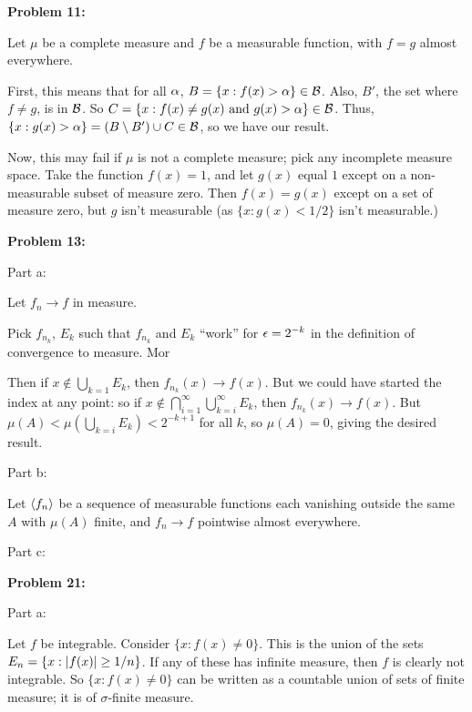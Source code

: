 \documentclass[a4paper,12pt]{article}
\begin{document}
\shunt

{\bf Problem 11:}

Let $\mu$ be a complete measure and $f$ be a measurable function, with $f=g$ almost everywhere.

First, this means that for all $\alpha$, $B= \{x: f(x) > \alpha\} \in \mathcal{B}$. Also, $B'$, the set where $f \neq g$, is in $\mathcal{B}$. So $C = \{x: f(x) \neq g(x) \text{ and } g(x) > \alpha \} \in \mathcal{B}$. Thus, $\{x: g(x) > \alpha\} = (B \setminus B') \cup C \in \mathcal{B}$, so we have our result. 

Now, this may fail if $\mu$ is not a complete measure; pick any incomplete measure space. Take the function $f(x)=1$, and let $g(x)$ equal $1$ except on a non-measurable subset of measure zero. Then $f(x)=g(x)$ except on a set of measure zero, but $g$ isn't measurable (as $\{x: g(x) < 1/2\}$ isn't measurable.)

\shunt

{\bf Problem 13:}

Part a:

Let $f_n \to f$ in measure.

Pick $f_{n_k}$, $E_{k}$ such that $f_{n_k}$ and $E_{k}$ ``work'' for $\epsilon = 2^{-k}$ in the definition of convergence to measure. Mor

Then if $x \notin \bigcup\limits_{k=1} E_k$, then $f_{n_k}(x) \to f(x)$. But we could have started the index at any point: so if $x \notin \bigcap\limits_{i=1}^\infty \bigcup\limits_{k=i}^\infty E_k$, then $f_{n_k}(x) \to f(x)$. But $\mu(A) < \mu(\bigcup_{k=i} E_k) < 2^{-k+1}$ for all $k$, so $\mu(A) = 0$, giving the desired result.

\shunt

Part b:

Let $\left\langle f_n \right\rangle$ be a sequence of measurable functions each vanishing outside the same $A$ with $\mu(A)$ finite, and $f_n \to f$ pointwise almost everywhere.


\shunt

Part c:


\shunt

{\bf Problem 21:}

Part a:

Let $f$ be integrable. Consider $\{x: f(x) \neq 0\}$. This is the union of the sets $E_n = \{x: \left\lvert f(x) \right\rvert \geq 1/n \}$. If any of these has infinite measure, then $f$ is clearly not integrable. So $\{x: f(x) \neq 0\}$ can be written as a countable union of sets of finite measure; it is of $\sigma$-finite measure.
\end{document}
